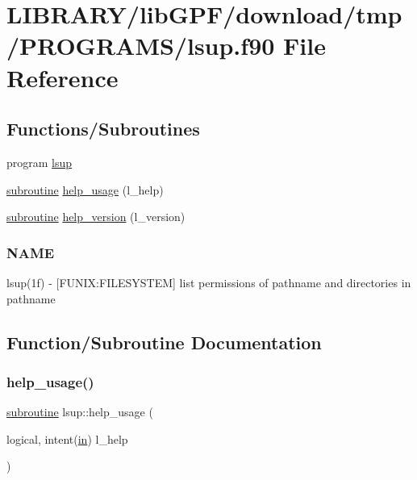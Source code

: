\hypertarget{lsup_8f90}{}\section{L\+I\+B\+R\+A\+R\+Y/lib\+G\+P\+F/download/tmp/\+P\+R\+O\+G\+R\+A\+M\+S/lsup.f90 File Reference}
\label{lsup_8f90}
\subsection*{Functions/\+Subroutines}
\begin{DoxyCompactItemize}
\item 
program \hyperlink{lsup_8f90_a3c3d8a93f4c35d7c95cd6db2e692b561}{lsup}
\item 
\hyperlink{M__stopwatch_83_8txt_acfbcff50169d691ff02d4a123ed70482}{subroutine} \hyperlink{lsup_8f90_ace9719243d0fef42bc7f2aa8094892ee}{help\+\_\+usage} (l\+\_\+help)
\item 
\hyperlink{M__stopwatch_83_8txt_acfbcff50169d691ff02d4a123ed70482}{subroutine} \hyperlink{lsup_8f90_a7566fe8ce05250d40d981110b710d428}{help\+\_\+version} (l\+\_\+version)
\begin{DoxyCompactList}\small\item\em \subsubsection*{N\+A\+ME}

lsup(1f) -\/ \mbox{[}F\+U\+N\+IX\+:F\+I\+L\+E\+S\+Y\+S\+T\+EM\mbox{]} list permissions of pathname and directories in pathname \end{DoxyCompactList}\end{DoxyCompactItemize}


\subsection{Function/\+Subroutine Documentation}
\mbox{\label{lsup_8f90_ace9719243d0fef42bc7f2aa8094892ee}} 
\subsubsection{\texorpdfstring{help\+\_\+usage()}{help\_usage()}}
{\footnotesize\ttfamily \hyperlink{M__stopwatch_83_8txt_acfbcff50169d691ff02d4a123ed70482}{subroutine} lsup\+::help\+\_\+usage (\begin{DoxyParamCaption}\item[{logical, intent(\hyperlink{M__journal_83_8txt_afce72651d1eed785a2132bee863b2f38}{in})}]{l\+\_\+help }\end{DoxyParamCaption})}



